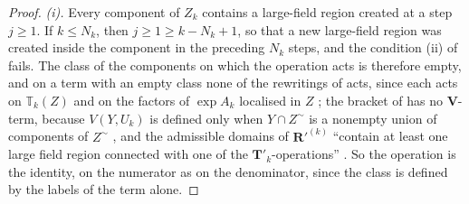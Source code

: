 \documentclass[11pt]{preprint}
\numberwithin{equation}{section}
\theoremstyle{definition}
\theoremstyle{remark}
\theoremstyle{plain}
\begin{document}
\begin{proof}
\emph{(i).} Every component of $Z_k$ contains a large-field region created at a step $j \geq 1$. If $k \leq N_k$, then $j \geq 1 \geq k - N_k + 1$, so that a new large-field region was created inside the component in the preceding $N_k$ steps, and the condition (ii) of \cite[p.~177]{BalabanLFR1} fails. The class of the components on which the operation acts is therefore empty, and on a term with an empty class none of the rewritings of \cite[Sect.~1]{BalabanLFR1} acts, since each acts on $\mathbb T_k(Z)$ and on the factors of $\exp A_k$ localised in $Z$ \cite[(1.1), p.~177]{BalabanLFR1}; the bracket of \cite[(1.72)]{BalabanLFR2} has no $\mathbf V$-term, because $V(Y, U_k)$ is defined only when $Y \cap Z^\sim$ is a nonempty union of components of $Z^\sim$ \cite[p.~377]{BalabanLFR2}, and the admissible domains of $\mathbf R'^{(k)}$ ``contain at least one large field region connected with one of the $\mathbf T'_k$-operations'' \cite[p.~390]{BalabanLFR2}. So the operation is the identity, on the numerator as on the denominator, since the class is defined by the labels of the term alone.


\end{proof}
\end{document}
